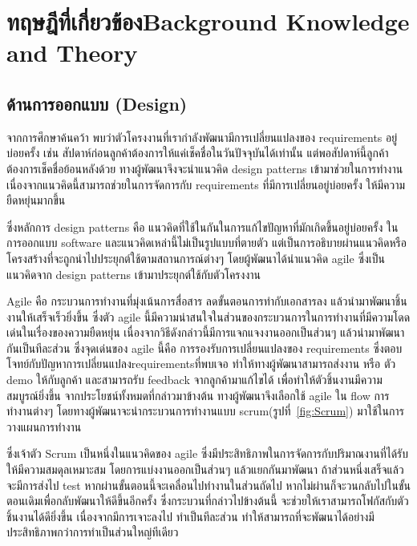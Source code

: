 \chapter{\ifcpe ทฤษฎีที่เกี่ยวข้อง\else Background Knowledge and Theory\fi}

\section{ด้านการออกแบบ (Design)}
จากการศึกษาค้นคว้า พบว่าตัวโครงงานที่เรากำลังพัฒนามีการเปลี่ยนแปลงของ requirements อยู่บ่อยครั้ง เช่น สัปดาห์ก่อนลูกค้าต้องการให้แค่เช็คชื่อในวันปัจจุบันได้เท่านั้น  แต่พอสัปดาห์นี้ลูกค้าต้องการเช็คชื่อย้อนหลังด้วย
ทางผู้พัฒนาจึงจะนำแนวคิด design patterns \cite{designPatterns} เข้ามาช่วยในการทำงาน เนื่องจากแนวคิดนี้สามารถช่วยในการจัดการกับ requirements ที่มีการเปลี่ยนอยู่บ่อยครั้ง ให้มีความยืดหยุ่นมากขึ้น


ซึ่งหลักการ design patterns คือ แนวคิดที่ใช้ในกันในการแก้ไขปัญหาที่มักเกิดขึ้นอยู่บ่อยครั้ง ในการออกแบบ software และแนวคิดเหล่านี้ไม่เป็นรูปแบบที่ตายตัว แต่เป็นการอธิบายผ่านแนวคิดหรือโครงสร้างที่จะถูกนำไปประยุกต์ใช้ตามสถานการณ์ต่างๆ  
โดยผู้พัฒนาได้นำแนวคิด agile \cite{agile}  ซึ่งเป็นแนวคิดจาก design patterns เข้ามาประยุกต์ใช้กับตัวโครงงาน 


Agile คือ กระบวนการทำงานที่มุ่งเน้นการสื่อสาร ลดขั้นตอนการทำกับเอกสารลง แล้วนำมาพัฒนาชิ้นงานให้เสร็จเร็วยิ่งขึ้น  ซึ่งตัว agile นี้มีความน่าสนใจในส่วนของกระบวนการในการทำงานที่มีความโดดเด่นในเรื่องของความยืดหยุ่น  เนื่องจากวิธีดังกล่าวนี้มีการแจกแจงงานออกเป็นส่วนๆ  แล้วนำมาพัฒนากันเป็นทีละส่วน  
ซึ่งจุดเด่นของ agile นี้คือ การรองรับการเปลี่ยนแปลงของ requirements ซึ่งตอบโจทย์กับปัญหาการเปลี่ยนแปลงrequirementsที่พบเจอ ทำให้ทางผู้พัฒนาสามารถส่งงาน หรือ ตัว demo ให้กับลูกค้า และสามารถรับ feedback จากลูกค้ามาแก้ไขได้ เพื่อทำให้ตัวชิ้นงานมีความสมบูรณ์ยิ่งขึ้น 
 จากประโยชน์ทั้งหมดที่กล่าวมาข้างต้น ทางผู้พัฒนาจึงเลือกใช้ agile ใน flow การทำงานต่างๆ โดยทางผู้พัฒนาจะนำกระบวนการทำงานแบบ scrum(รูปที่~\ref{fig:Scrum}) \cite{srcum} มาใช้ในการวางแผนการทำงาน 


ซึ่งเจ้าตัว Scrum เป็นหนึ่งในแนวคิดของ agile ซึ่งมีประสิทธิภาพในการจัดการกับปริมาณงานที่ได้รับให้มีความสมดุลเหมาะสม  โดยการแบ่งงานออกเป็นส่วนๆ แล้วแยกกันมาพัฒนา  ถ้าส่วนหนึ่งเสร็จแล้วจะมีการส่งไป test  หากผ่านขั้นตอนนี้จะเคลื่อนไปทำงานในส่วนถัดไป  หากไม่ผ่านก็จะวนกลับไปในขั้นตอนเดิมเพื่อกลับพัฒนาให้ดีขึ้นอีกครั้ง ซึ่งกระบวนที่กล่าวไปข้างต้นนี้  จะช่วยให้เราสามารถโฟกัสกับตัวชิ้นงานได้ดียิ่งขึ้น เนื่องจากมีการเจาะลงไป ทำเป็นทีละส่วน ทำให้สามารถที่จะพัฒนาได้อย่างมีประสิทธิภาพกว่าการทำเป็นส่วนใหญ่ทีเดียว


